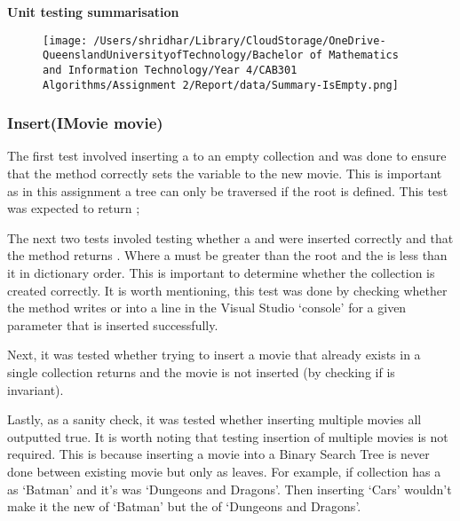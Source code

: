 \documentclass[a4paper]{article}
\begin{document}
\noindent
\textbf{Unit testing summarisation}
\begin{figure}[H]
   \texttt{[image: /Users/shridhar/Library/CloudStorage/OneDrive-QueenslandUniversityofTechnology/Bachelor of Mathematics and Information Technology/Year 4/CAB301 Algorithms/Assignment 2/Report/data/Summary-IsEmpty.png]}
\end{figure}

\subsubsection{Insert{(IMovie movie)}}
The first test involved inserting a  to an empty collection and was done to ensure that the method correctly sets the  variable to the new movie. This is important as in this assignment a tree can only be traversed if the root is defined. This test was expected to return ;
\vspace{2mm}

\noindent
The next two tests involed testing whether a  and  were inserted correctly and that the method returns . Where a  must be greater than the root and the  is less than it in dictionary order. This is important to determine whether the collection is created correctly. It is worth mentioning, this test was done by checking whether the  method writes  or  into a line in the Visual Studio `console' for a given  parameter that is inserted successfully.
\vspace{2mm}

\noindent
Next, it was tested whether trying to insert a movie that already exists in a single collection returns  and the movie is not inserted (by checking if  is invariant).
\vspace{2mm}

\noindent
Lastly, as a sanity check, it was tested whether inserting multiple movies all outputted true. It is worth noting that testing insertion of multiple movies is not required. This is because inserting a movie into a Binary Search Tree is never done between existing movie but only as leaves. For example, if collection has a  as `Batman' and it's  was `Dungeons and Dragons'. Then inserting `Cars' wouldn't make it the new  of `Batman' but the  of `Dungeons and Dragons'. 
\vspace{2mm}
\end{document}
